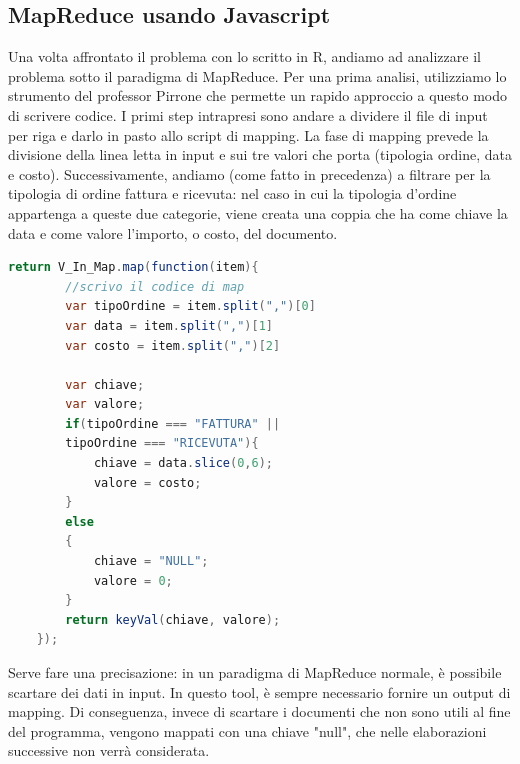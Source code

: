 \subsection{MapReduce usando Javascript}
Una volta affrontato il problema con lo scritto in R, andiamo ad analizzare il problema sotto il paradigma di MapReduce. Per una prima analisi, utilizziamo lo strumento del professor Pirrone che permette un rapido approccio a questo modo di scrivere codice. I primi step intrapresi sono andare a dividere il file di input per riga e darlo in pasto allo script di mapping.
La fase di mapping prevede la divisione della linea letta in input e sui tre valori che porta (tipologia ordine, data e costo). Successivamente, andiamo (come fatto in precedenza) a filtrare per la tipologia di ordine fattura e ricevuta: nel caso in cui la tipologia d'ordine appartenga a queste due categorie, viene creata una coppia che ha come chiave la data e come valore l'importo, o costo, del documento.


\begin{lstlisting}[language=Java, caption={Script di mapping}]
    return V_In_Map.map(function(item){
        //scrivo il codice di map
        var tipoOrdine = item.split(",")[0]
        var data = item.split(",")[1]
        var costo = item.split(",")[2]

        var chiave;
        var valore;
        if(tipoOrdine === "FATTURA" ||
        tipoOrdine === "RICEVUTA"){
            chiave = data.slice(0,6);
            valore = costo;
        }
        else
        {
            chiave = "NULL";
            valore = 0;
        }
        return keyVal(chiave, valore);
    });

\end{lstlisting}
Serve fare una precisazione: in un paradigma di MapReduce normale, è possibile scartare dei dati in input. In questo tool, è sempre necessario fornire un output di mapping. Di conseguenza, invece di scartare i documenti che non sono utili al fine del programma, vengono mappati con una chiave "null", che nelle elaborazioni successive non verrà considerata.

